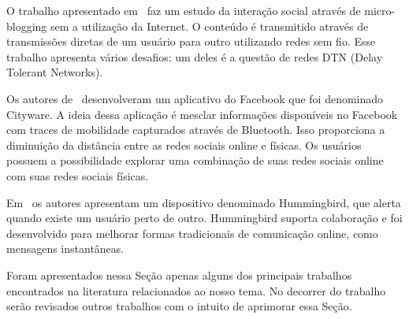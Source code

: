 O trabalho apresentado em~\cite{Uttering}
faz um estudo da interação social através de micro-blogging sem a
utilização da Internet. O conteúdo é transmitido através de transmissões
diretas de um usuário para outro utilizando redes sem fio. Esse trabalho
apresenta vários desafios: um deles é a questão de redes DTN (Delay
Tolerant Networks).

Os autores de~\cite{SocialNetworking} desenvolveram um aplicativo
do Facebook que foi denominado Cityware. A ideia dessa aplicação é
mesclar informações disponíveis no Facebook com traces de
mobilidade capturados através de Bluetooth. Isso proporciona a
diminuição da distância entre as redes sociais online e
físicas. Os usuários possuem a possibilidade explorar uma
combinação de suas redes sociais online com suas redes sociais físicas.

Em~\cite{Hummingbird} os autores apresentam um dispositivo denominado
Hummingbird, que alerta quando existe um usuário perto de outro.
Hummingbird suporta colaboração e foi desenvolvido para melhorar formas
tradicionais de comunicação online, como mensagens instantâneas.

Foram apresentados nessa Seção apenas alguns dos principais trabalhos
encontrados na literatura relacionados ao nosso tema. No decorrer do
trabalho serão revisados outros trabalhos com o intuito de
aprimorar essa Seção.
